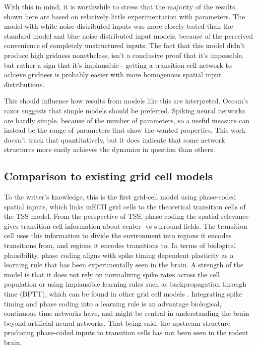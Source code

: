 \documentclass{article}
\begin{document}
    With this in mind, it is worthwhile to stress that the majority of the results shown here are based on relatively little experimentation with parameters. The model with white noise distributed inputs was more closely tested than the standard model and blue noise distributed input models, because of the perceived convenience of completely unstructured inputs. The fact that this model didn't produce high gridness nonetheless, isn't a conclusive proof that it's impossible, but rather a sign that it's implausible - getting a transition cell network to achieve gridness is probably easier with more homogenous spatial input distributions.

    This should influence how results from models like this are interpreted. Occam's razor suggests that simple models should be preferred. Spiking neural networks are hardly simple, because of the number of parameters, so a useful measure can instead be the range of parameters that show the wanted properties. This work doesn't track that quantitatively, but it does indicate that some network structures more easily achieves the dynamics in question than others.

    \subsection{Comparison to existing grid cell models} \label{Other model comparisons}

    To the writer's knowledge, this is the first grid-cell model using phase-coded spatial inputs, which links mECII grid cells to the theoretical transition cells of the TSS-model. From the perspective of TSS, phase coding the spatial relevance gives transition cell information about center- vs surround fields. The transition cell uses this information to divide the environment into regions it encodes transitions from, and regions it encodes transitions to. In terms of biological plausibility, phase coding aligns with spike timing dependent plasticity as a learning rule that has been experimentally seen in the brain. A strength of the model is that it does not rely on normalizing spike rates across the cell population or using implausible learning rules such as backpropagation through time (BPTT), which can be found in other grid cell models \parencite{Kropff2008,Sorscher2023}. Integrating spike timing and phase coding into a learning rule is an advantage biological, continuous time networks have, and might be central in understanding the brain beyond artificial neural networks. That being said, the upstream structure producing phase-coded inputs to transition cells has not been seen in the rodent brain. 
\end{document}
